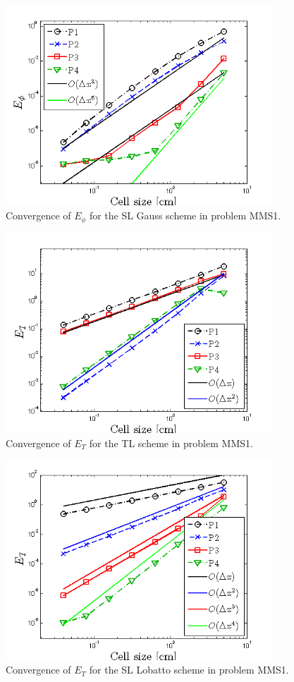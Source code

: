 %
%
\begin{figure}[!hbp]
\centering
\includegraphics[width=10cm]{chapter6_grey_radtran/Dissertation_Data/MMS2_SLXS_Gauss_phi_L2.png}
\caption{Convergence of $E_{\phi}$ for the SL Gauss scheme in problem MMS1.}
\label{fig:mms1_gauss_phi}
\end{figure}
%
\pagebreak
%
\begin{figure}[!ht]
\centering
\includegraphics[width=10cm]{chapter6_grey_radtran/Dissertation_Data/MMS2_TL_temp_L2.png}
\caption{Convergence of $E_{T}$ for the TL scheme in problem MMS1.}
\label{fig:mms1_tl_temp}
\end{figure}
%
%
\begin{figure}[!ht]
\centering
\includegraphics[width=10cm]{chapter6_grey_radtran/Dissertation_Data/MMS2_SLXS_Lobatto_temp_L2.png}
\caption{Convergence of $E_{T}$ for the SL Lobatto scheme in problem MMS1.}
\label{fig:mms1_lobatto_temp}
\end{figure}
